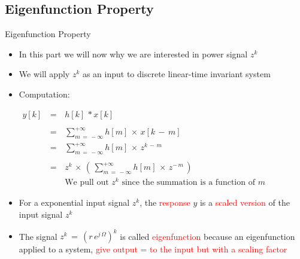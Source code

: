 \subsection{Eigenfunction Property} 
\begin{frame}[t,allowframebreaks]{Eigenfunction Property}

\begin{itemize}

\item In this part we will now why we are interested in power signal $z^k$ 

\item We will apply $z^k$ as an input to discrete linear-time invariant system

\item Computation:


$\begin{array}{rcl}
y[k] \, &=& \, h[k] \, * x[k] \\ \\
		&=& \, \displaystyle\sum_{m \, = \, - \infty}^{+ \infty} h[m] \, \times \, x[k \, - \, m] \\
		&=& \, \displaystyle\sum_{m \, = \, - \infty}^{+ \infty} h[m] \, \times \, z^{k \, - \, m} \\ \\
		&=& \, z^k \, \times \, \left(\, \displaystyle\sum_{m \, = \, - \infty}^{+ \infty} h[m] \, \times \, z^{- \, m} \, \right)\\
		&& \, \text{We pull out } z^k \text{ since the summation is a function of } m
\end{array}$

\item For a exponential input signal $z^k$, the \textcolor{red}{response} $y$ is a \textcolor{red}{scaled version} of the input signal $z^k$

\item The signal  $z^k \, = \, (r \, e^{j \, \Omega})^k$ is called \textcolor{red}{eigenfunction} because an eigenfunction applied to a system, \textcolor{red}{give output = to the input but with a scaling factor}

\end{itemize}


\end{frame}

